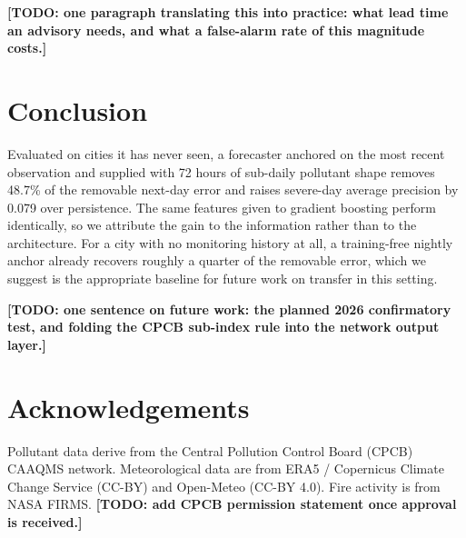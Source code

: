 \documentclass[conference]{IEEEtran}
\newcommand{\todo}[1]{\textbf{[TODO: #1]}}
\begin{document}
\todo{one paragraph translating this into practice: what lead time an advisory needs, and
what a false-alarm rate of this magnitude costs.}

\section{Conclusion}

Evaluated on cities it has never seen, a forecaster anchored on the most recent
observation and supplied with 72 hours of sub-daily pollutant shape removes 48.7\% of the
removable next-day error and raises severe-day average precision by 0.079 over
persistence. The same features given to gradient boosting perform identically, so we
attribute the gain to the information rather than to the architecture. For a city with no
monitoring history at all, a training-free nightly anchor already recovers roughly a
quarter of the removable error, which we suggest is the appropriate baseline for future
work on transfer in this setting.

\todo{one sentence on future work: the planned 2026 confirmatory test, and folding the
CPCB sub-index rule into the network output layer.}

\section*{Acknowledgements}

Pollutant data derive from the Central Pollution Control Board (CPCB) CAAQMS network.
Meteorological data are from ERA5 / Copernicus Climate Change Service (CC-BY) and
Open-Meteo (CC-BY 4.0). Fire activity is from NASA FIRMS.
\todo{add CPCB permission statement once approval is received.}
\end{document}
